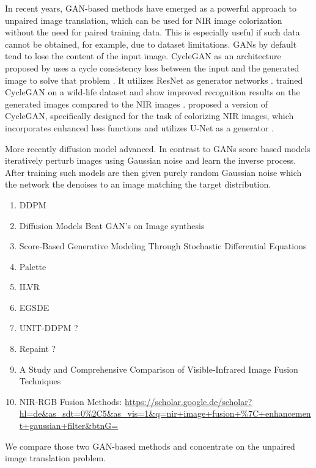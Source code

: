 In recent years, GAN-based methods have emerged as a powerful approach to unpaired image translation, which can be used for NIR image colorization without the need for paired training data.
This is especially useful if such data cannot be obtained, for example, due to dataset limitations.
GANs by default tend to lose the content of the input image. CycleGAN as an architecture proposed by  uses a cycle consistency loss between the input and the generated image to solve that problem \cite{cyclegan-original}.
It utilizes ResNet \parencite{resnet} as generator networks \parencite{cyclegan-original}.
 trained CycleGAN on a wild-life dataset and show improved recognition results on the generated images compared to the NIR images \parencite{cyclegan-camera-traps}.
 proposed a version of CycleGAN, specifically designed for the task of colorizing NIR images, which incorporates enhanced loss functions and utilizes U-Net as a generator \parencite{mehri}.

More recently diffusion model advanced. 
In contrast to GANs score based models iteratively perturb images using Gaussian noise and learn the inverse process. 
After training such models are then given purely random Gaussian noise which the network the denoises to an image matching the target distribution. 



\begin{enumerate}
    \item DDPM \cite{ddpm}
    \item Diffusion Models Beat GAN's on Image synthesis \cite{diffusion-beats-gans}
    \item Score-Based Generative Modeling Through Stochastic Differential Equations \cite{sbgm}
    \item Palette \cite{palette}
    \item ILVR \cite{ilvr}
    \item EGSDE \cite{egsde}
    \item UNIT-DDPM ? \cite{unit-ddpm}
    \item Repaint ? \cite{repaint}
    \item A Study and Comprehensive Comparison of Visible-Infrared Image Fusion Techniques \cite{study-vis-nir-fusion}
    \item NIR-RGB Fusion Methods: \url{https://scholar.google.de/scholar?hl=de&as_sdt=0%2C5&as_vis=1&q=nir+image+fusion+%7C+enhancement+gaussian+filter&btnG=}
\end{enumerate}


We compare those two GAN-based methods and concentrate on the unpaired image translation problem.



